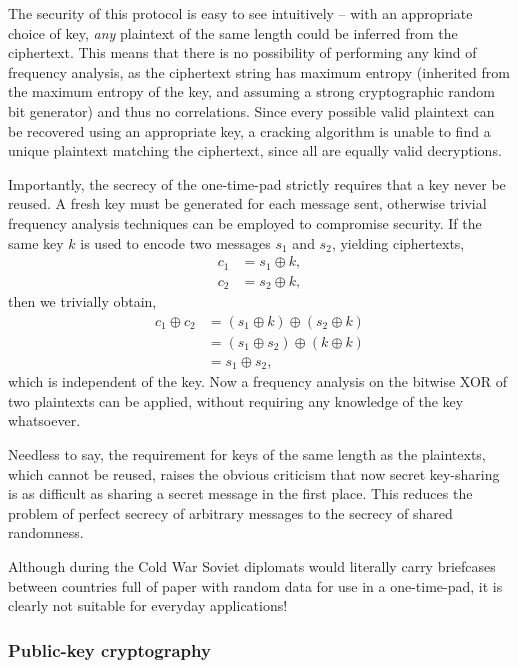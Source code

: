 The security of this protocol is easy to see intuitively -- with an appropriate choice of key, \textit{any} plaintext of the same length could be inferred from the ciphertext. This means that there is no possibility of performing any kind of frequency analysis, as the ciphertext string has maximum entropy (inherited from the maximum entropy of the key, and assuming a strong cryptographic random bit generator) and thus no correlations. Since every possible valid plaintext can be recovered using an appropriate key, a cracking algorithm is unable to find a unique plaintext matching the ciphertext, since all are equally valid decryptions.

Importantly, the secrecy of the one-time-pad strictly requires that a key never be reused. A fresh key must be generated for each message sent, otherwise trivial frequency analysis techniques can be employed to compromise security. If the same key $k$ is used to encode two messages $s_1$ and $s_2$, yielding ciphertexts,
\begin{align}
c_1&=s_1\oplus k,\nonumber\\
c_2&=s_2\oplus k,
\end{align}
then we trivially obtain,
\begin{align}
c_1 \oplus c_2 &= (s_1 \oplus k) \oplus (s_2 \oplus k) \nonumber \\
&= (s_1 \oplus s_2) \oplus (k \oplus k) \nonumber \\
&= s_1 \oplus s_2,
\end{align}
which is independent of the key. Now a frequency analysis on the bitwise XOR of two plaintexts can be applied, without requiring any knowledge of the key whatsoever.

Needless to say, the requirement for keys of the same length as the plaintexts, which cannot be reused, raises the obvious criticism that now secret key-sharing is as difficult as sharing a secret message in the first place. This reduces the problem of perfect secrecy of arbitrary messages to the secrecy of shared randomness. 

Although during the Cold War Soviet diplomats would literally carry briefcases between countries full of paper with random data for use in a one-time-pad, it is clearly not suitable for everyday applications!

%
%

\subsubsection{Public-key cryptography}

